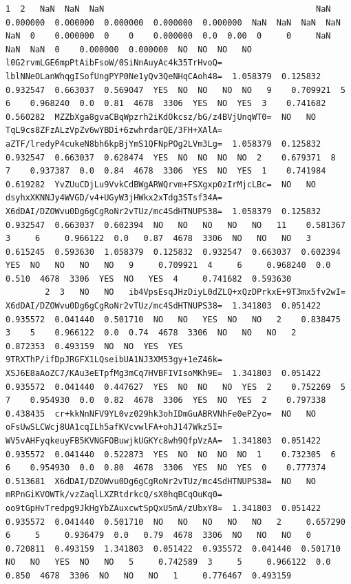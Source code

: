\documentclass[11pt]{article}
\begin{document}
\begin{Verbatim}[commandchars=\\\{\}]
        1  2   NaN  NaN  NaN                                           NaN                                           0.000000  0.000000  0.000000  0.000000  0.000000  NaN  NaN  NaN  NaN  NaN  0    0.000000  0    0    0.000000  0.0  0.00  0     0     NaN  NaN  NaN  0    0.000000  0.000000  NO  NO  NO   NO   l0G2rvmLGE6mpPtAibFsoW/0SiNnAuyAc4k35TrHvoQ=  lblNNeOLanWhqgISofUngPYP0Ne1yQv3QeNHqCAoh48=  1.058379  0.125832  0.932547  0.663037  0.569047  YES  NO  NO   NO  NO   9    0.709921  5    6    0.968240  0.0  0.81  4678  3306  YES  NO  YES  3    0.741682  0.560282  MZZbXga8gvaCBqWpzrh2iKdOkcsz/bG/z4BVjUnqWT0=  NO   NO  TqL9cs8ZFzALzVpZv6wYBDi+6zwhrdarQE/3FH+XAlA=  aZTF/lredyP4cukeN8bh6kpBjYmS1QFNpPOg2LVm3Lg=  1.058379  0.125832  0.932547  0.663037  0.628474  YES  NO  NO  NO  NO  2    0.679371  8    7    0.937387  0.0  0.84  4678  3306  YES  NO  YES  1    0.741984  0.619282  YvZUuCDjLu9VvkCdBWgARWQrvm+FSXgxp0zIrMjcLBc=  NO   NO  dsyhxXKNNJy4WVGD/v4+UGyW3jHWkx2xTdg3STsf34A=  X6dDAI/DZOWvu0Dg6gCgRoNr2vTUz/mc4SdHTNUPS38=  1.058379  0.125832  0.932547  0.663037  0.602394  NO   NO   NO   NO   NO   11    0.581367  3     6     0.966122  0.0   0.87  4678  3306  NO   NO   NO   3     0.615245  0.593630  1.058379  0.125832  0.932547  0.663037  0.602394  YES  NO   NO   NO   NO   9     0.709921  4     6     0.968240  0.0   0.510  4678  3306  YES  NO   YES  4     0.741682  0.593630
        2  3   NO   NO   ib4VpsEsqJHzDiyL0dZLQ+xQzDPrkxE+9T3mx5fv2wI=  X6dDAI/DZOWvu0Dg6gCgRoNr2vTUz/mc4SdHTNUPS38=  1.341803  0.051422  0.935572  0.041440  0.501710  NO   NO   YES  NO   NO   2    0.838475  3    5    0.966122  0.0  0.74  4678  3306  NO   NO   NO   2    0.872353  0.493159  NO  NO  YES  YES  9TRXThP/ifDpJRGFX1LQseibUA1NJ3XM53gy+1eZ46k=  XSJ6E8aAoZC7/KAu3eETpfMg3mCq7HVBFIVIsoMKh9E=  1.341803  0.051422  0.935572  0.041440  0.447627  YES  NO  NO   NO  YES  2    0.752269  5    7    0.954930  0.0  0.82  4678  3306  YES  NO  YES  2    0.797338  0.438435  cr+kkNnNFV9YL0vz029hk3ohIDmGuABRVNhFe0ePZyo=  NO   NO  oFsUwSLCWcj8UA1cqILh5afKVcvwlFA+ohJ147Wkz5I=  WV5vAHFyqkeuyFB5KVNGFOBuwjkUGKYc8wh9QfpVzAA=  1.341803  0.051422  0.935572  0.041440  0.522873  YES  NO  NO  NO  NO  1    0.732305  6    6    0.954930  0.0  0.80  4678  3306  YES  NO  YES  0    0.777374  0.513681  X6dDAI/DZOWvu0Dg6gCgRoNr2vTUz/mc4SdHTNUPS38=  NO   NO  mRPnGiKVOWTk/vzZaqlLXZRtdrkcQ/sX0hqBCqOuKq0=  oo9tGpHvTredpg9JkHgYbZAuxcwtSpQxU5mA/zUbxY8=  1.341803  0.051422  0.935572  0.041440  0.501710  NO   NO   NO   NO   NO   2     0.657290  6     5     0.936479  0.0   0.79  4678  3306  NO   NO   NO   0     0.720811  0.493159  1.341803  0.051422  0.935572  0.041440  0.501710  NO   NO   YES  NO   NO   5     0.742589  3     5     0.966122  0.0   0.850  4678  3306  NO   NO   NO   1     0.776467  0.493159

\end{Verbatim}
\end{document}
